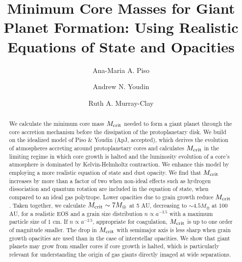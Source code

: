 \documentclass[apj]{emulateapj}
\begin{document}



\title{Minimum Core Masses for Giant Planet Formation: Using Realistic Equations of State and Opacities}
\author{Ana-Maria A. Piso}
\author{Andrew N. Youdin}
\author{Ruth A. Murray-Clay}

\begin{abstract}

We calculate the minimum core mass $M_{\rm crit}$ needed to form a giant planet through the core accretion mechanism before the dissipation of the protoplanetary disk. We build on the idealized model of Piso \& Youdin (ApJ, accepted), which derives the evolution of atmospheres accreting around protoplanetary cores and calculates $M_{\rm crit}$ in the limiting regime in which core growth is halted and the luminosity evolution of a core's atmosphere is dominated by Kelvin-Helmholtz contraction. We enhance this model by employing a more realistic equation of state and dust opacity. We find that $M_{\rm crit}$ increases by more than a factor of two when non-ideal effects such as hydrogen dissociation and quantum rotation are included in the equation of state, when compared to an ideal gas polytrope. Lower opacities due to grain growth reduce $M_{\rm crit}$. Taken together, we calculate $M_{\rm crit} \sim 7 M_{\oplus}$ at 5 AU, decreasing to $\sim$$4.5 M_{\oplus}$ at 100 AU, for a realistic EOS and a grain size distribution $n \propto a^{-3.5}$ with a maximum particle size of 1 cm. 
If $n \propto a^{-2.5}$, appropriate for coagulation, $M_{\rm crit}$ is up to one order of magnitude smaller. The drop in $M_{\rm crit}$ with semimajor axis is less sharp when grain growth opacities are used than in the case of interstellar opacities. We show that giant planets may grow from smaller cores if core growth is halted, which is particularly relevant for understanding the origin of gas giants directly imaged at wide separations.  



\end{abstract}
\end{document}
